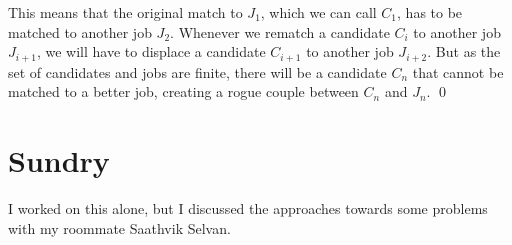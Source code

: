 \documentclass{article}
\begin{document}
\begin{enumerate}[label=\alph*.]
		This means that the original match to $J_1$, which we can call $C_1$, has to be matched 
		to another job $J_2$. 
		Whenever we rematch a candidate $C_i$ to another job $J_{i+1}$, we will have to displace 
		a candidate $C_{i+1}$ to another job $J_{i+2}$. But as the set 
		of candidates and jobs are finite, there will be a candidate $C_n$ that cannot be matched to
		a better job, creating a rogue couple between $C_n$ and $J_n$. \qed 
\end{enumerate}

\section{Sundry}
I worked on this alone, but I discussed the approaches towards some problems with my roommate
Saathvik Selvan.
\end{document}
